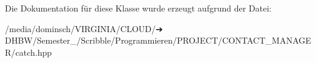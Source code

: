 Die Dokumentation für diese Klasse wurde erzeugt aufgrund der Datei\+:\begin{DoxyCompactItemize}
\item 
/media/dominsch/\+V\+I\+R\+G\+I\+N\+I\+A/\+C\+L\+O\+U\+D/➔ D\+H\+B\+W/\+Semester\+\_/\+Scribble/\+Programmieren/\+P\+R\+O\+J\+E\+C\+T/\+C\+O\+N\+T\+A\+C\+T\+\_\+\+M\+A\+N\+A\+G\+E\+R/catch.\+hpp\end{DoxyCompactItemize}
